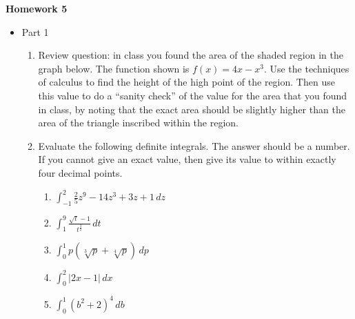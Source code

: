 \documentclass{article}
\begin{document}
\begin{center}
    \large \textbf{Homework 5}
\end{center}
        \begin{itemize}
            \item Part 1
                \begin{enumerate}

    \item Review question: in class you found the area of the shaded region in the graph below. The function shown is $f(x) = 4x-x^3$. Use the techniques of calculus to find the height of the high point of the region. Then use this value to do a ``sanity check'' of the value for the area that you found in class, by noting that the exact area should be slightly higher than the area of the triangle inscribed within the region.
\begin{center}
\end{center}

    \item Evaluate the following definite integrals. The answer should be a number. If you cannot give an exact value, then give its value to within exactly four decimal points. 
    \begin{enumerate}
        \item $\displaystyle \int_{-1}^{2} \frac{2}{5}z^9-{1}{4}z^3 + 3z + 1 \, dz$
        \item $\displaystyle \int_1^9 \frac{\sqrt{t}-1}{t^{\frac{3}{2}}}\,dt$
        \item $\displaystyle \int_0^1 p(\sqrt[3]{p}+\sqrt[4]{p})\,dp$
        \item $\displaystyle \int_{0}^{2} \left| 2x-1
        \right|\,dx$
        \item $\displaystyle \int_0^1 (b^2+2)^4\,db$
    \end{enumerate}


\end{enumerate}
\end{itemize}
\end{document}
